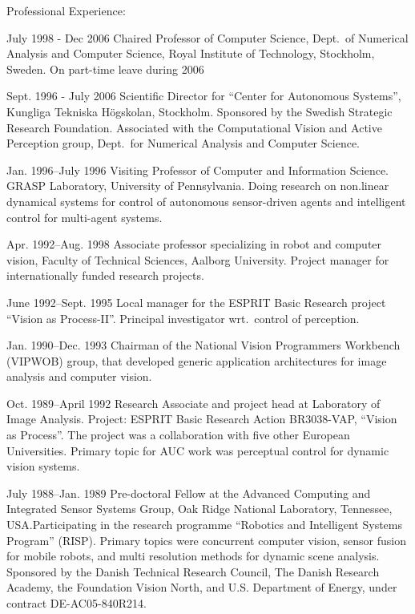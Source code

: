 \documentclass{article}
\begin{document}
\begin{cv}
\begin{cvlist}{Professional Experience:}
		\item[July 1998 - Dec 2006] Chaired Professor of Computer Science,
		Dept.\ of Numerical Analysis and Computer Science, Royal Institute
		of Technology, Stockholm, Sweden. On part-time leave during 2006

		\item[Sept. 1996 - July 2006] Scientific Director for ``Center for
		Autonomous Systems'', Kungliga Tek\-ni\-ska H\"og\-skolan,
		Stock\-holm.  Sponsored by the Swedish Strategic Research
		Foundation. Associated with the Computational Vision and Active
		Perception group, Dept.~for Numerical Analysis and Computer
		Science.

		\item[Jan. 1996--July 1996] Visiting Professor of Computer and
		Information Science.  GRASP Laboratory, University of Pennsylvania.
		Doing research on non.linear dynamical systems for control of
		autonomous sensor-driven agents and intelligent control for
		multi-agent systems.

		\item[Apr. 1992--Aug. 1998] Associate professor specializing in robot
		and computer vision, Faculty of Technical Sciences, Aalborg
		University.  Project manager for internationally funded research
		projects.

		\item[June 1992--Sept. 1995] Local manager for the ESPRIT Basic
		Research project ``Vision as Process-II''.  Principal investigator
		wrt.\ control of perception.

		\item[Jan. 1990--Dec. 1993] Chairman of the National Vision Programmers
		Workbench (VIPWOB) group, that developed generic application architectures for
		image analysis and computer vision.

		\item[Oct. 1989--April 1992] Research Associate and project head at Laboratory
		of Image Analysis. Project: ESPRIT Basic Research Action BR3038-VAP, ``Vision
		as Process''. The project was a collaboration with five other European
		Universities. Primary topic for AUC work was perceptual control for dynamic
		vision systems.

		\item[July 1988--Jan. 1989] Pre-doctoral Fellow at the Advanced Computing and
		Integrated Sensor Systems Group, Oak Ridge National Laboratory, Tennessee,
		USA.\@ Participating in the research programme ``Robotics and Intelligent
		Systems Program'' (RISP). Primary topics were concurrent computer vision,
		sensor fusion for mobile robots, and multi resolution methods for dynamic
		scene analysis. Sponsored by the Danish Technical Research Council, The Danish
		Research Academy, the Foundation Vision North, and U.S. Department of Energy,
		under contract DE-AC05-840R214.\@


\end{cvlist}
\end{cv}
\end{document}
